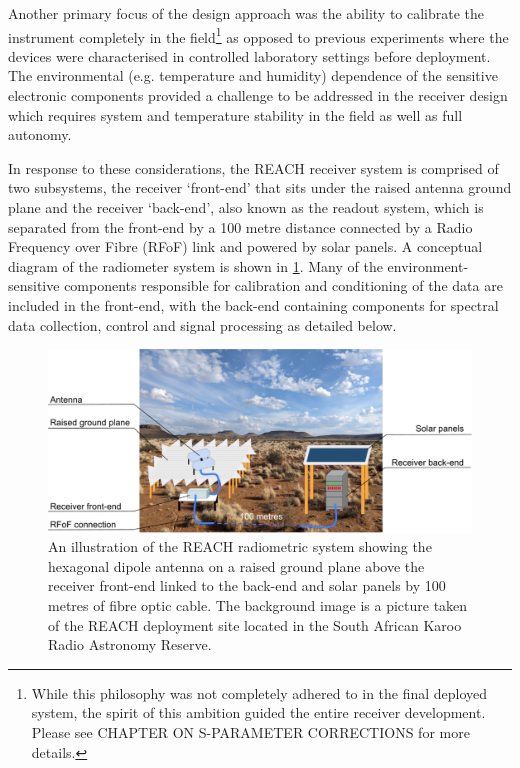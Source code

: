 Another primary focus of the design approach was the ability to calibrate the instrument completely in the field\footnote{While this philosophy was not completely adhered to in the final deployed system, the spirit of this ambition guided the entire receiver development. Please see CHAPTER ON S-PARAMETER CORRECTIONS for more details.} as opposed to previous experiments where the devices were characterised in controlled laboratory settings before deployment. The environmental (e.g. temperature and humidity) dependence of the sensitive electronic components provided a challenge to be addressed in the receiver design which requires system and temperature stability in the field as well as full autonomy.

In response to these considerations, the REACH receiver system is comprised of two subsystems, the receiver ‘front-end’ that sits under the raised antenna ground plane and the receiver ‘back-end’, also known as the readout system, which is separated from the front-end by a 100 metre distance connected by a Radio Frequency over Fibre (RFoF) link and powered by solar panels. A conceptual diagram of the radiometer system is shown in \cref{fig:system_diagram}. Many of the environment-sensitive components responsible for calibration and conditioning of the data are included in the front-end, with the back-end containing components for spectral data collection, control and signal processing as detailed below.
\begin{figure}
    \centering
    \includegraphics[width=\textwidth]{system_diagram}
    \caption{An illustration of the REACH radiometric system showing the hexagonal dipole antenna on a raised ground plane above the receiver front-end linked to the back-end and solar panels by 100 metres of fibre optic cable. The background image is a picture taken of the REACH deployment site located in the South African Karoo Radio Astronomy Reserve.}
    \label{fig:system_diagram}
\end{figure}


